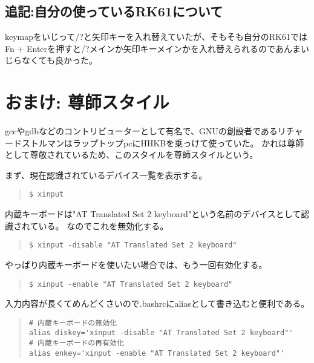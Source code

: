 \documentclass[dvipdfmx]{jsarticle}
\begin{document}
\subsection{追記:自分の使っているRK61について}

keymapをいじって/?と矢印キーを入れ替えていたが、そもそも自分のRK61ではFn + Enterを押すと/?メインか矢印キーメインかを入れ替えられるのであんまいじらなくても良かった。


\section{おまけ: 尊師スタイル}

gccやgdbなどのコントリビューターとして有名で、GNUの創設者であるリチャードストルマンはラップトップpcにHHKBを乗っけて使っていた。
かれは尊師として尊敬されているため、このスタイルを尊師スタイルという。


まず、現在認識されているデバイス一覧を表示する。
\begin{quote}
    \begin{verbatim}
$ xinput
    \end{verbatim}
\end{quote}

内蔵キーボードは"AT Translated Set 2 keyboard"という名前のデバイスとして認識されている。
なのでこれを無効化する。

\begin{quote}
    \begin{verbatim}
$ xinput -disable "AT Translated Set 2 keyboard" 
    \end{verbatim}
\end{quote}

やっぱり内蔵キーボードを使いたい場合では、もう一回有効化する。

\begin{quote}
    \begin{verbatim}
$ xinput -enable "AT Translated Set 2 keyboard" 
    \end{verbatim}
\end{quote}

入力内容が長くてめんどくさいので.bashrcにaliasとして書き込むと便利である。

\begin{quote}
    \begin{verbatim}
# 内蔵キーボードの無効化
alias diskey='xinput -disable "AT Translated Set 2 keyboard"' 
# 内蔵キーボードの再有効化
alias enkey='xinput -enable "AT Translated Set 2 keyboard"' 
    \end{verbatim}
\end{quote}
\end{document}
